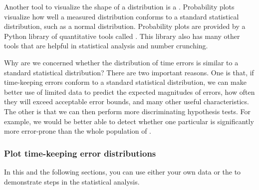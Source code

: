Another tool to visualize the shape of a distribution is a .
Probability plots visualize how well a measured distribution conforms to a standard statistical distribution, such as a normal distribution. 
Probability plots are provided by a Python library of quantitative tools called \scipy.
This library also has many other tools that are helpful in statistical analysis and number crunching. 

Why are we concerned whether the distribution of time errors is similar to a standard statistical distribution? 
There are two important reasons. 
One is that, if time-keeping errors conform to a standard statistical distribution, we can make better use of limited data to predict the expected magnitudes of errors, how often they will exceed acceptable error bounds, and many other useful characteristics. 
The other is that we can then perform more discriminating hypothesis tests.
For example, we would be better able to detect whether one particular \rtc is significantly more error-prone than the whole population of \rtcs.


\subsubsection{\howto Plot time-keeping error distributions}
In this and the following sections, you can use either your own data or the  to demonstrate steps in the statistical analysis. 

